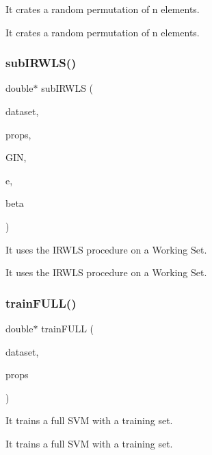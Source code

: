 It crates a random permutation of n elements. 

It crates a random permutation of n elements. \hypertarget{PIRWLS-train_8h_af736cb71af5e7e4cb062977793905f4d}{}\label{PIRWLS-train_8h_af736cb71af5e7e4cb062977793905f4d} 
\subsubsection{\texorpdfstring{sub\+I\+R\+W\+L\+S()}{subIRWLS()}}
{\ttfamily double$\ast$ sub\+I\+R\+W\+LS (\begin{DoxyParamCaption}\item[{\hyperlink{structsvm__dataset}{svm\+\_\+dataset}}]{dataset,  }\item[{\hyperlink{structproperties}{properties}}]{props,  }\item[{double $\ast$}]{G\+IN,  }\item[{double $\ast$}]{e,  }\item[{double $\ast$}]{beta }\end{DoxyParamCaption})}



It uses the I\+R\+W\+LS procedure on a Working Set. 

It uses the I\+R\+W\+LS procedure on a Working Set. \hypertarget{PIRWLS-train_8h_ad719770a7de382211555ba831af2ea28}{}\label{PIRWLS-train_8h_ad719770a7de382211555ba831af2ea28} 
\subsubsection{\texorpdfstring{train\+F\+U\+L\+L()}{trainFULL()}}
{\ttfamily double$\ast$ train\+F\+U\+LL (\begin{DoxyParamCaption}\item[{\hyperlink{structsvm__dataset}{svm\+\_\+dataset}}]{dataset,  }\item[{\hyperlink{structproperties}{properties}}]{props }\end{DoxyParamCaption})}



It trains a full S\+VM with a training set. 

It trains a full S\+VM with a training set. 